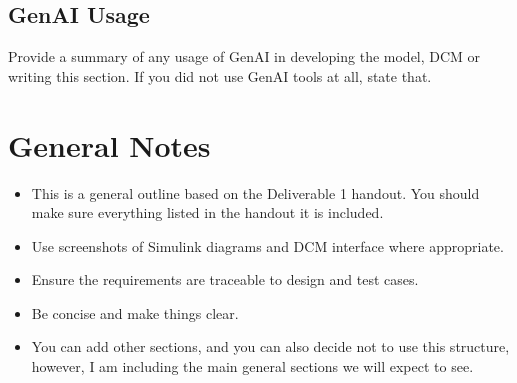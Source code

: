 \documentclass{article}
\begin{document}
\subsection{GenAI Usage}
Provide a summary of any usage of GenAI in developing the model, DCM or writing this section. If you did not use GenAI tools at all, state that.

\section{General Notes}
\begin{itemize}
    \item This is a general outline based on the Deliverable 1 handout. You should make sure everything listed in the handout it is included. 
    \item Use screenshots of Simulink diagrams and DCM interface where appropriate.
    \item Ensure the requirements are traceable to design and test cases.
    \item Be concise and make things clear.
    \item You can add other sections, and you can also decide not to use this structure, however, I am including the main general sections we will expect to see.
\end{itemize}
\end{document}

